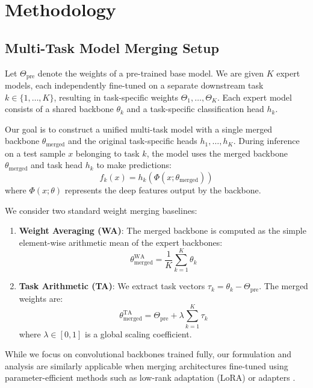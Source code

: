 \documentclass{article}
\theoremstyle{plain}
\theoremstyle{definition}
\begin{document}
\section{Methodology}
\label{sec:method}

\subsection{Multi-Task Model Merging Setup}
Let $\Theta_{\text{pre}}$ denote the weights of a pre-trained base model. We are given $K$ expert models, each independently fine-tuned on a separate downstream task $k \in \{1, \dots, K\}$, resulting in task-specific weights $\Theta_1, \dots, \Theta_K$. Each expert model consists of a shared backbone $\theta_k$ and a task-specific classification head $h_k$.

Our goal is to construct a unified multi-task model with a single merged backbone $\theta_{\text{merged}}$ and the original task-specific heads $h_1, \dots, h_K$. During inference on a test sample $x$ belonging to task $k$, the model uses the merged backbone $\theta_{\text{merged}}$ and task head $h_k$ to make predictions:
\begin{equation}
    f_k(x) = h_k(\Phi(x; \theta_{\text{merged}}))
\end{equation}
where $\Phi(x; \theta)$ represents the deep features output by the backbone. 

We consider two standard weight merging baselines:
\begin{enumerate}\setlength{\itemsep}{0pt}\setlength{\parskip}{0pt}
    \item \textbf{Weight Averaging (WA)}: The merged backbone is computed as the simple element-wise arithmetic mean of the expert backbones:
    \begin{equation}
        \theta_{\text{merged}}^{\text{WA}} = \frac{1}{K} \sum_{k=1}^K \theta_k
    \end{equation}
    \item \textbf{Task Arithmetic (TA)}: We extract task vectors $\tau_k = \theta_k - \Theta_{\text{pre}}$. The merged weights are:
    \begin{equation}
        \theta_{\text{merged}}^{\text{TA}} = \Theta_{\text{pre}} + \lambda \sum_{k=1}^K \tau_k
    \end{equation}
    where $\lambda \in [0, 1]$ is a global scaling coefficient.
\end{enumerate}
While we focus on convolutional backbones trained fully, our formulation and analysis are similarly applicable when merging architectures fine-tuned using parameter-efficient methods such as low-rank adaptation (LoRA) \cite{hu2022lora} or adapters \cite{pmlr-v97-houlsby19a}.
\end{document}
